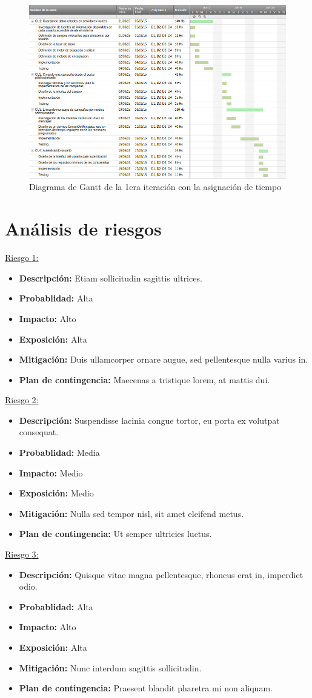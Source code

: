 \documentclass[a4paper, 10pt, twoside]{article}
\newcommand{\riesgo}[7]{
  \underline{Riesgo {#1}:}
  \begin{itemize}   
    \item \textbf{Descripción:} {#2}
    \item \textbf{Probablidad:} {#3}
    \item \textbf{Impacto:} {#4}
    \item \textbf{Exposición:} {#5}
    \item \textbf{Mitigación:} {#6}
    \item \textbf{Plan de contingencia:} {#7}
  \end{itemize}
}
\begin{document}
\begin{landscape}
\begin{figure}[h!]
  \centering
  \includegraphics[width=20cm]{gantt.png}
  \caption{Diagrama de Gantt de la 1era iteración con la asignación de tiempo}
  \label{fig:gantt}
\end{figure}
\end{landscape}
\newpage


\section{Análisis de riesgos}
\label{riesgos:r1}
\riesgo{1}
    {Etiam sollicitudin sagittis ultrices.}
    {Alta}
    {Alto}
    {Alta}
    {Duis ullamcorper ornare augue, sed pellentesque nulla varius in.}
    {Maecenas a tristique lorem, at mattis dui.}

\riesgo{2}
    {Suspendisse lacinia congue tortor, eu porta ex volutpat consequat.}
    {Media}
    {Medio}
    {Medio}
    {Nulla sed tempor nisl, sit amet eleifend metus.}
    {Ut semper ultricies luctus.}

\riesgo{3}
    {Quisque vitae magna pellentesque, rhoncus erat in, imperdiet odio.}
    {Alta}
    {Alto}
    {Alta}
    {Nunc interdum sagittis sollicitudin.}
    {Praesent blandit pharetra mi non aliquam.}

\newpage
\end{document}

